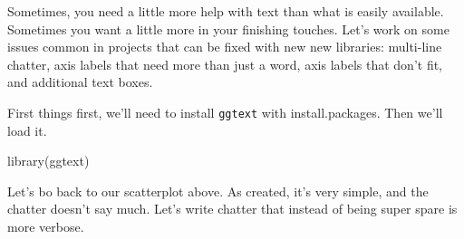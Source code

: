 \documentclass[
  letterpaper,
  DIV=11,
  numbers=noendperiod]{scrreprt}
\newenvironment{Shaded}{\begin{snugshade}}{\end{snugshade}}
\newcommand{\FunctionTok}[1]{\textcolor[rgb]{0.28,0.35,0.67}{#1}}
\newcommand{\NormalTok}[1]{\textcolor[rgb]{0.00,0.23,0.31}{#1}}
\begin{document}
Sometimes, you need a little more help with text than what is easily
available. Sometimes you want a little more in your finishing touches.
Let's work on some issues common in projects that can be fixed with new
new libraries: multi-line chatter, axis labels that need more than just
a word, axis labels that don't fit, and additional text boxes.

First things first, we'll need to install \texttt{ggtext} with
install.packages. Then we'll load it.

\begin{Shaded}
\begin{Highlighting}[]
\FunctionTok{library}\NormalTok{(ggtext)}
\end{Highlighting}
\end{Shaded}

Let's bo back to our scatterplot above. As created, it's very simple,
and the chatter doesn't say much. Let's write chatter that instead of
being super spare is more verbose.
\end{document}
